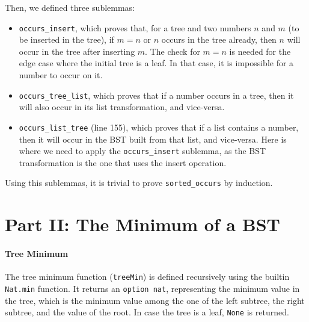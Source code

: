 \documentclass[a4paper]{article}
\begin{document}


Then, we defined three sublemmas:

\begin{itemize}
    \item \texttt{occurs\_insert}, which proves that, for a tree and two numbers $n$ and $m$ (to be inserted in the tree), if $m=n$ or $n$ occurs in the tree already, then $n$ will occur in the tree after inserting $m$. The check for $m=n$ is needed for the edge case where the initial tree is a leaf. In that case, it is impossible for a number to occur on it.
    

    \item \texttt{occurs\_tree\_list}, which proves that if a number occurs in a tree, then it will also occur in its list transformation, and vice-versa.
    
    
    \item \texttt{occurs\_list\_tree} (line 155), which proves that if a list contains a number, then it will occur in the BST built from that list, and vice-versa. Here is where we need to apply the \texttt{occurs\_insert} sublemma, as the BST transformation is the one that uses the insert operation.
    
\end{itemize}

Using this sublemmas, it is trivial to prove \texttt{sorted\_occurs} by induction.



\section{Part II: The Minimum of a BST}

\paragraph{Tree Minimum} The tree minimum function (\texttt{treeMin}) is defined recursively using the builtin \texttt{Nat.min} function. It returns an \texttt{option nat}, representing the minimum value in the tree, which is the minimum value among the one of the left subtree, the right subtree, and the value of the root. In case the tree is a leaf, \texttt{None} is returned.
\end{document}
